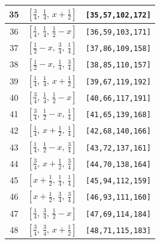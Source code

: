\documentclass[fleqn,8pt]{jsarticle}
\begin{document}
\begin{longtable}{ccc}
35 & $\left[ \frac{3}{4},\, \frac{1}{4},\, x + \frac{1}{2} \right]$ & {\tt [35,57,102,172]} \\ \hline
36 & $\left[ \frac{1}{4},\, \frac{1}{4},\, \frac{1}{2} - x \right]$ & {\tt [36,59,103,171]} \\ \hline
37 & $\left[ \frac{1}{2} - x,\, \frac{3}{4},\, \frac{1}{4} \right]$ & {\tt [37,86,109,158]} \\ \hline
38 & $\left[ \frac{1}{2} - x,\, \frac{1}{4},\, \frac{3}{4} \right]$ & {\tt [38,85,110,157]} \\ \hline
39 & $\left[ \frac{1}{4},\, \frac{1}{4},\, x + \frac{1}{2} \right]$ & {\tt [39,67,119,192]} \\ \hline
40 & $\left[ \frac{3}{4},\, \frac{1}{4},\, \frac{1}{2} - x \right]$ & {\tt [40,66,117,191]} \\ \hline
41 & $\left[ \frac{3}{4},\, \frac{1}{2} - x,\, \frac{1}{4} \right]$ & {\tt [41,65,139,168]} \\ \hline
42 & $\left[ \frac{1}{4},\, x + \frac{1}{2},\, \frac{1}{4} \right]$ & {\tt [42,68,140,166]} \\ \hline
43 & $\left[ \frac{1}{4},\, \frac{1}{2} - x,\, \frac{3}{4} \right]$ & {\tt [43,72,137,161]} \\ \hline
44 & $\left[ \frac{3}{4},\, x + \frac{1}{2},\, \frac{3}{4} \right]$ & {\tt [44,70,138,164]} \\ \hline
45 & $\left[ x + \frac{1}{2},\, \frac{1}{4},\, \frac{1}{4} \right]$ & {\tt [45,94,112,159]} \\ \hline
46 & $\left[ x + \frac{1}{2},\, \frac{3}{4},\, \frac{3}{4} \right]$ & {\tt [46,93,111,160]} \\ \hline
47 & $\left[ \frac{1}{4},\, \frac{3}{4},\, \frac{1}{2} - x \right]$ & {\tt [47,69,114,184]} \\ \hline
48 & $\left[ \frac{3}{4},\, \frac{3}{4},\, x + \frac{1}{2} \right]$ & {\tt [48,71,115,183]} \\
\end{longtable}
\renewcommand{\arraystretch}{1.2}
\end{document}
